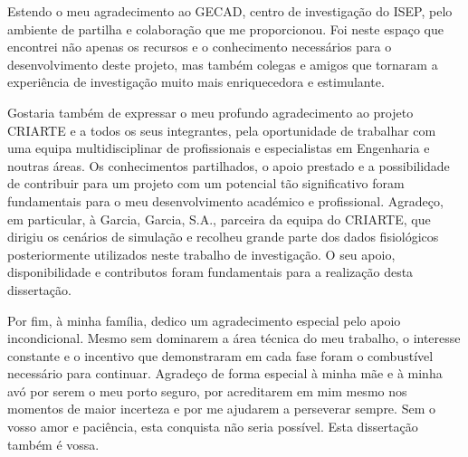 {\begin{acknowledgements}
Estendo o meu agradecimento ao GECAD, centro de investigação do ISEP, pelo ambiente de partilha e colaboração que me proporcionou. Foi neste espaço que encontrei não apenas os recursos e o conhecimento necessários para o desenvolvimento deste projeto, mas também colegas e amigos que tornaram a experiência de investigação muito mais enriquecedora e estimulante.

Gostaria também de expressar o meu profundo agradecimento ao projeto CRIARTE e a todos os seus integrantes, pela oportunidade de trabalhar com uma equipa multidisciplinar de profissionais e especialistas em Engenharia e noutras áreas. Os conhecimentos partilhados, o apoio prestado e a possibilidade de contribuir para um projeto com um potencial tão significativo foram fundamentais para o meu desenvolvimento académico e profissional. Agradeço, em particular, à Garcia, Garcia, S.A., parceira da equipa do CRIARTE, que dirigiu os cenários de simulação e recolheu grande parte dos dados fisiológicos posteriormente utilizados neste trabalho de investigação. O seu apoio, disponibilidade e contributos foram fundamentais para a realização desta dissertação.

Por fim, à minha família, dedico um agradecimento especial pelo apoio incondicional. Mesmo sem dominarem a área técnica do meu trabalho, o interesse constante e o incentivo que demonstraram em cada fase foram o combustível necessário para continuar. Agradeço de forma especial à minha mãe e à minha avó por serem o meu porto seguro, por acreditarem em mim mesmo nos momentos de maior incerteza e por me ajudarem a perseverar sempre. Sem o vosso amor e paciência, esta conquista não seria possível. Esta dissertação também é vossa.
\end{acknowledgements}


\tableofcontents %

\listoffigures %

\listoftables %

\listofalgorithms %
\addchaptertocentry{\listalgorithmname}


\renewcommand{\lstlistlistingname}{List of Source Code}
\iflanguage{portuguese}{
\renewcommand{\lstlistlistingname}{Lista de C\'odigo}
}
\lstlistoflistings %
\addchaptertocentry{\lstlistlistingname}


}

